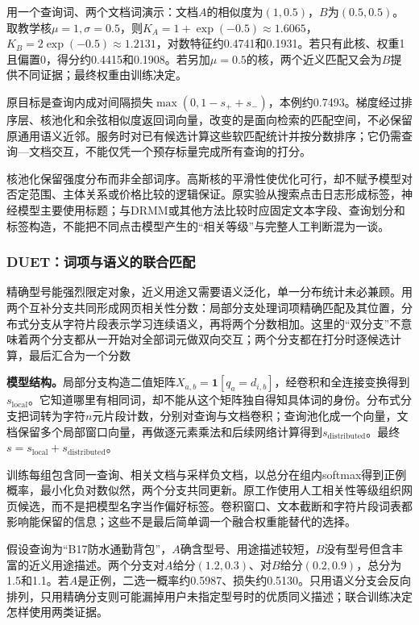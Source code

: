 用一个查询词、两个文档词演示：文档$A$的相似度为$(1,0.5)$，$B$为$(0.5,0.5)$。取教学核$\mu=1,\sigma=0.5$，则$K_A=1+\exp(-0.5)\approx1.6065$，$K_B=2\exp(-0.5)\approx1.2131$，对数特征约0.4741和0.1931。若只有此核、权重1且偏置0，得分约0.4415和0.1908。若另加$\mu=0.5$的核，两个近义匹配又会为$B$提供不同证据；最终权重由训练决定。

原目标是查询内成对间隔损失$\max(0,1-s_++s_-)$，本例约0.7493。梯度经过排序层、核池化和余弦相似度返回词向量，改变的是面向检索的匹配空间，不必保留原通用语义近邻。服务时对已有候选计算这些软匹配统计并按分数排序；它仍需查询—文档交互，不能仅凭一个预存标量完成所有查询的打分。

核池化保留强度分布而非全部词序。高斯核的平滑性使优化可行，却不赋予模型对否定范围、主体关系或价格比较的逻辑保证。原实验从搜索点击日志形成标签，神经模型主要使用标题；与DRMM或其他方法比较时应固定文本字段、查询划分和标签构造，不能把不同点击模型产生的“相关等级”与完整人工判断混为一谈。

\Needspace{100mm}
\subsubsection{DUET：词项与语义的联合匹配}
\label{sec:rs-search-duet}

精确型号能强烈限定对象，近义用途又需要语义泛化，单一分布统计未必兼顾。用两个互补分支共同形成网页相关性分数：局部分支处理词项精确匹配及其位置，分布式分支从字符片段表示学习连续语义，再将两个分数相加。这里的“双分支”不意味着两个分支都从一开始对全部词元做双向交互；两个分支都在打分时逐候选计算，最后汇合为一个分数

\textbf{模型结构。}局部分支构造二值矩阵$X_{a,b}=\mathbf1[q_a=d_{i,b}]$，经卷积和全连接变换得到$s_{\mathrm{local}}$。它知道哪里有相同词，却不能从这个矩阵独自得知具体词的身份。分布式分支把词转为字符$n$元片段计数，分别对查询与文档卷积；查询池化成一个向量，文档保留多个局部窗口向量，再做逐元素乘法和后续网络计算得到$s_{\mathrm{distributed}}$。最终$s=s_{\mathrm{local}}+s_{\mathrm{distributed}}$。

训练每组包含同一查询、相关文档与采样负文档，以总分在组内softmax得到正例概率，最小化负对数似然，两个分支共同更新。原工作使用人工相关性等级组织网页候选，而不是把模型名字当作偏好标签。卷积窗口、文本截断和字符片段词表都影响能保留的信息；这些不是最后简单调一个融合权重能替代的选择。

假设查询为“B17防水通勤背包”，$A$确含型号、用途描述较短，$B$没有型号但含丰富的近义用途描述。两个分支对$A$给分$(1.2,0.3)$、对$B$给分$(0.2,0.9)$，总分为1.5和1.1。若$A$是正例，二选一概率约0.5987、损失约0.5130。只用语义分支会反向排列，只用精确分支则可能漏掉用户未指定型号时的优质同义描述；联合训练决定怎样使用两类证据。


